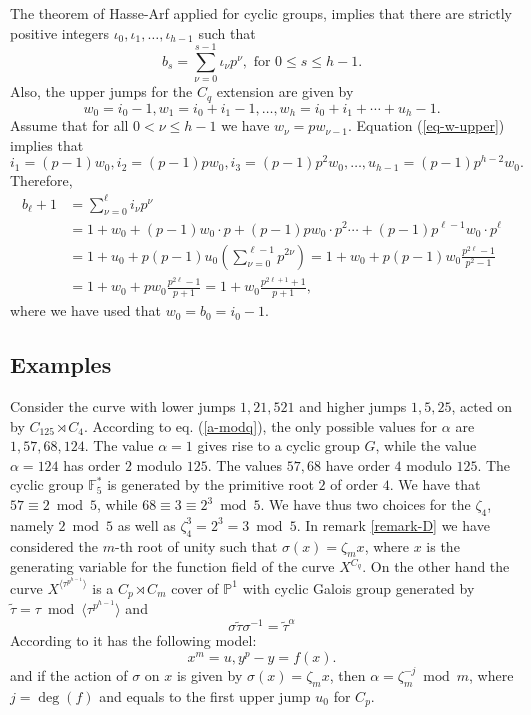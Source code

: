 \documentclass[11pt,letterpaper]{amsart}
\theoremstyle{definition}
\renewcommand{\mod}{\bmod}
\begin{document}
The theorem of Hasse-Arf \cite[p. 77]{SeL} applied for cyclic groups, implies that there are strictly positive integers $\iota_0,\iota_1,\ldots,\iota_{h-1}$ such that  
\[
b_s=\sum_{\nu=0}^{s-1} \iota_\nu p^\nu, \text{ for } 0 \leq s \leq h-1.
\]
 Also, 
the upper jumps for the $C_q$ extension are given by 
\begin{equation}
\label{eq-w-upper}
  w_0=i_0-1, w_1=i_0+i_1-1,\ldots,w_h=i_0+i_1+\cdots+u_h-1.
\end{equation}
Assume that for all $0 < \nu \leq h-1$ we have $w_{\nu}= p w_{\nu-1}$. 
Equation (\ref{eq-w-upper}) implies that 
\[
i_1=(p-1)w_0, i_2=(p-1)pw_0,i_3=(p-1)p^2w_0,\ldots, u_{h-1}=(p-1)p^{h-2}w_0.
\]
Therefore, 
\begin{align*}
  b_\ell+1 &=\sum_{\nu=0}^{\ell} i_\nu p^\nu
  \\
  &=1 +w_0 +(p-1)w_0 \cdot p + (p-1)p w_0 \cdot p^2
  \cdots+ (p-1)p^{\ell-1}w_0 \cdot p^\ell
\\
&=
1+u_0 + p(p-1)u_0 
\left(
\sum_{\nu=0}^{\ell-1} 
p^{2 \nu}
\right)
=
1+ w_0 +  p(p-1)w_0 \frac{p^{2 \ell}-1}{p^2-1}
\\
&=
1+w_0+ pw_0 \frac{p^{2 \ell}-1}{p+1}
=
1+ w_0\frac{p^{2 \ell+1}+1}{p+1},
\end{align*}
where we have used that $w_0=b_0=i_0-1$. 


\subsection{Examples}
\label{sec:no-lift}


Consider the curve with lower jumps $1,21,521$ and higher jumps $1,5,25$, acted on by $C_{125} \rtimes C_4$. According to eq. (\ref{a-modq}), the only possible values for $\alpha$ are $1,57,68,124$. The value $\alpha=1$ gives rise to a cyclic group $G$, while the value $\alpha=124$ has order $2$ modulo $125$. The values $57,68$ have order $4$ modulo $125$. The cyclic group $\mathbb{F}_5^*$ is generated by the primitive root $2$ of order $4$. We have that $57\equiv 2 \mod5$, while $68\equiv 3 \equiv 2^3 \mod5$. 
We have thus two choices for the $\zeta_4$, namely $2\mod 5$ as well as $\zeta_4^3= 2^3=3 \mod 5$. In remark \ref{remark-D} we have considered the $m$-th root of unity such that $\sigma(x) = \zeta_m x$, where $x$ is the generating variable for the function field of the curve $X^{C_q}$. 
On the other hand the curve 
$X^{\langle \tau^{p^{h-1}}\rangle}$ 
is a $C_p \rtimes C_m$ cover of $\mathbb{P}^1$ with cyclic Galois group generated by $\tilde{\tau }=\tau \mod \langle \tau^{p^{h-1}} \rangle$ 
and 
\[
  \sigma \tilde{\tau } \sigma^{-1} = \tilde{\tau}^\alpha 
\]
According to \cite[lemma 1.4.1]{Pries:02} it has the following model:
\[
  x^m=u, y^p-y=f(x).
\]
and if the action of $\sigma$ on $x$ is given by 
$\sigma(x)=\zeta_m x$, then $\alpha=\zeta_m^{-j} \mod m$, where $j=\deg(f)$ and equals to the first upper jump $u_0$ for $C_p$. 
\end{document}
